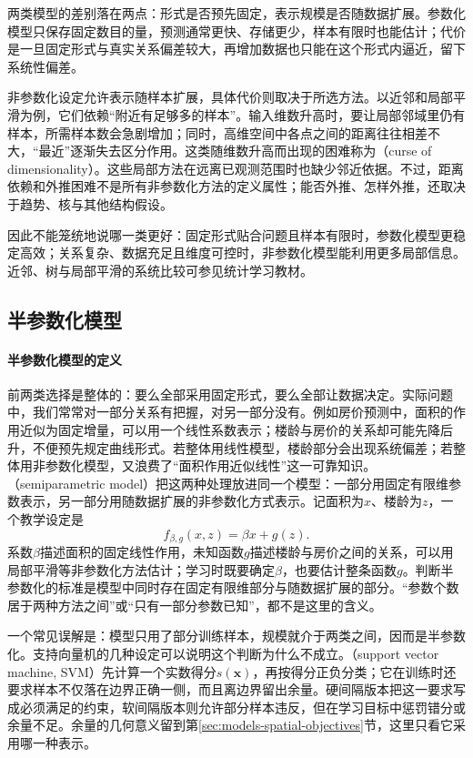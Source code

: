 两类模型的差别落在两点：形式是否预先固定，表示规模是否随数据扩展。参数化模型只保存固定数目的量，预测通常更快、存储更少，样本有限时也能估计；代价是一旦固定形式与真实关系偏差较大，再增加数据也只能在这个形式内逼近，留下系统性偏差。

非参数化设定允许表示随样本扩展，具体代价则取决于所选方法。以近邻和局部平滑为例，它们依赖“附近有足够多的样本”。输入维数升高时，要让局部邻域里仍有样本，所需样本数会急剧增加；同时，高维空间中各点之间的距离往往相差不大，“最近”逐渐失去区分作用。这类随维数升高而出现的困难称为（curse of dimensionality）。这些局部方法在远离已观测范围时也缺少邻近依据。不过，距离依赖和外推困难不是所有非参数化方法的定义属性；能否外推、怎样外推，还取决于趋势、核与其他结构假设。

因此不能笼统地说哪一类更好：固定形式贴合问题且样本有限时，参数化模型更稳定高效；关系复杂、数据充足且维度可控时，非参数化模型能利用更多局部信息。近邻、树与局部平滑的系统比较可参见统计学习教材。

\subsection{半参数化模型}
\label{sec:models-semiparametric}

\paragraph{半参数化模型的定义}

前两类选择是整体的：要么全部采用固定形式，要么全部让数据决定。实际问题中，我们常常对一部分关系有把握，对另一部分没有。例如房价预测中，面积的作用近似为固定增量，可以用一个线性系数表示；楼龄与房价的关系却可能先降后升，不便预先规定曲线形式。若整体用线性模型，楼龄部分会出现系统偏差；若整体用非参数化模型，又浪费了“面积作用近似线性”这一可靠知识。（semiparametric model）把这两种处理放进同一个模型：一部分用固定有限维参数表示，另一部分用随数据扩展的非参数化方式表示。记面积为$x$、楼龄为$z$，一个教学设定是
\begin{equation}
  f_{\beta,g}(x,z)=\beta x+g(z).
  \label{eq:models-semiparametric}
\end{equation}
系数$\beta$描述面积的固定线性作用，未知函数$g$描述楼龄与房价之间的关系，可以用局部平滑等非参数化方法估计；学习时既要确定$\beta$，也要估计整条函数$g$。判断半参数化的标准是模型中同时存在固定有限维部分与随数据扩展的部分。“参数个数居于两种方法之间”或“只有一部分参数已知”，都不是这里的含义。

一个常见误解是：模型只用了部分训练样本，规模就介于两类之间，因而是半参数化。支持向量机的几种设定可以说明这个判断为什么不成立。（support vector machine, SVM）先计算一个实数得分$s(\bm{x})$，再按得分正负分类；它在训练时还要求样本不仅落在边界正确一侧，而且离边界留出余量。硬间隔版本把这一要求写成必须满足的约束，软间隔版本则允许部分样本违反，但在学习目标中惩罚错分或余量不足。余量的几何意义留到第\ref{sec:models-spatial-objectives}节，这里只看它采用哪一种表示。


